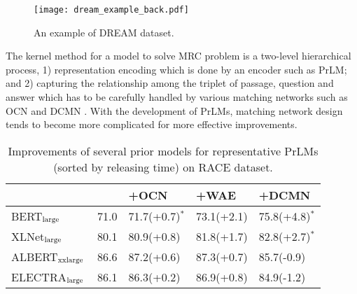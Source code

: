 \documentclass[letterpaper]{article} \usepackage{aaai21}  \usepackage{times}  \usepackage{helvet} \usepackage{courier}  \usepackage[hyphens]{url}  \usepackage{graphicx} \urlstyle{rm} \def\UrlFont{\rm}  \usepackage{natbib}  \usepackage{caption} \frenchspacing  \setlength{\pdfpagewidth}{8.5in}  \setlength{\pdfpageheight}{11in}
\begin{document}
\begin{figure}
	\centering
	\texttt{[image: dream\_example\_back.pdf]}
	\caption{\label{tab:example_dream} An example of DREAM dataset.}
\end{figure}

The kernel method for a model to solve MRC problem is a two-level hierarchical process, 1) representation encoding which is done by an encoder such as PrLM; and 2) capturing the relationship among the triplet of passage, question and answer which has to be carefully handled by various matching networks such as OCN \cite{ocn} and DCMN \cite{dcmn}. With the development of PrLMs, matching network design tends to become more complicated for more effective improvements. 

\begin{table}[h]\small
\renewcommand\arraystretch{1.3}
	\centering
	{
		\begin{tabular}{@{}p{1.9cm}|@{}p{0.45cm}|l|l|p{1.3cm}}
			\hline		
			 		& & +OCN & +WAE & +DCMN \\
			\hline
			\hline
			BERT$_{\rm large}$  & \,71.0 & 71.7(+0.7)$^*$ & 73.1(+2.1)& 75.8(+4.8)$^*$ \\
			XLNet$_{\rm large}$& \,80.1 & 80.9(+0.8) & 81.8(+1.7)& 82.8(+2.7)$^*$ \\
			ALBERT$_{\rm xxlarge}$  & \,86.6  & 87.2(+0.6) & 87.3(+0.7) & 85.7(-0.9) \\
			ELECTRA$_{\rm large}$  &  \,86.1 & 86.3(+0.2) & 86.9(+0.8)&  84.9(-1.2)\\
			\hline
		\end{tabular}
		
	}
	\caption{Improvements of several prior models for representative PrLMs (sorted by releasing time) on RACE dataset.}
	\label{lm_and_net_compare}
\end{table}
\end{document}
